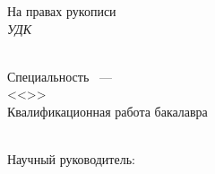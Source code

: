 
\thispagestyle{empty}%
\begin{center}%
    \MakeUppercase{\thesisOrganization}
\end{center}%

\vspace{0pt plus1fill} %
\begin{flushright}%
    На правах рукописи \\
    \textsl {УДК \thesisUdk}
\end{flushright}%

\vspace{0pt plus1fill} %
\begin{center}%
    {\large \thesisAuthor}
\end{center}%

\vspace{0pt plus1fill} %
\begin{center}%
    \textbf {\large \thesisTitle} \\
    \vspace{0pt plus4fill} %
    {%
        Специальность \thesisSpecialtyNumber~--- \\
        <<\thesisSpecialtyTitle>> \\
    }
    \vspace{0pt plus4fill} %
    {
        Квалификационная работа бакалавра \\
        \thesisDegree \\
    }
\end{center}%

\vspace{0pt plus6fill} %
\begin{flushright}%
    Научный руководитель: \\
    \supervisorRegalia \\
    \supervisorFio \\
\end{flushright}%

